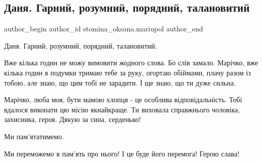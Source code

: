  
 
 
 
 

\subsection{Даня. Гарний, розумний, порядний, талановитий}
\label{sec:01_06_2023.fb.stomina_oksana.mariupol.1.danja_garnyj_rozymnyj_porjadnyj_talanovytyj}

\ifcmt
 author_begin
   author_id stomina_oksana.mariupol
 author_end
\fi

Даня. Гарний, розумний, порядний, талановитий.

Вже кілька годин не можу вимовити жодного слова. Бо слів замало. Марічко, вже
кілька годин я подумки тримаю тебе за руку, огортаю обіймами, плачу разом із
тобою, але знаю, що цим тобі не зарадити. І ще знаю, що ти дуже сильна. 

Марічко, люба моя, бути мамою хлопця - це особлива відповідальність. Тобі
вдалося виконати цю місію якнайкраще. Ти виховала справжнього чоловіка,
захисника, героя. Дякую за сина, серденько! 

Ми пам'ятатимемо. 

Ми переможемо в пам'ять про нього! І це буде його перемога! Герою слава!
